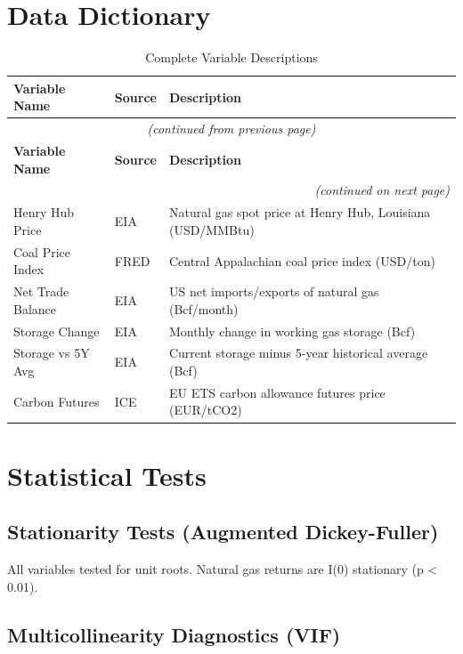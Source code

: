 \documentclass[12pt,a4paper]{article}
\begin{document}
\section{Data Dictionary}

\begin{longtable}{@{}p{4cm}p{2.5cm}p{8cm}@{}}
\caption{Complete Variable Descriptions} \\
\toprule
\textbf{Variable Name} & \textbf{Source} & \textbf{Description} \\
\midrule
\endfirsthead

\multicolumn{3}{c}{\textit{(continued from previous page)}} \\
\toprule
\textbf{Variable Name} & \textbf{Source} & \textbf{Description} \\
\midrule
\endhead

\midrule
\multicolumn{3}{r}{\textit{(continued on next page)}} \\
\endfoot

\bottomrule
\endlastfoot

Henry Hub Price & EIA & Natural gas spot price at Henry Hub, Louisiana (USD/MMBtu) \\
Coal Price Index & FRED & Central Appalachian coal price index (USD/ton) \\
Net Trade Balance & EIA & US net imports/exports of natural gas (Bcf/month) \\
Storage Change & EIA & Monthly change in working gas storage (Bcf) \\
Storage vs 5Y Avg & EIA & Current storage minus 5-year historical average (Bcf) \\
Carbon Futures & ICE & EU ETS carbon allowance futures price (EUR/tCO2) \\
\end{longtable}

\section{Statistical Tests}

\subsection{Stationarity Tests (Augmented Dickey-Fuller)}

All variables tested for unit roots. Natural gas returns are I(0) stationary (p < 0.01).

\subsection{Multicollinearity Diagnostics (VIF)}
\end{document}
